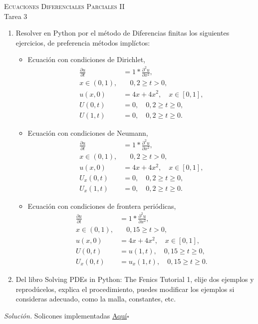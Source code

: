 \documentclass[12pt]{article}
\newcommand{\sol}{\textit{Solución. }}
\newcommand{\eej}{\hfill $\square$}
\begin{document}
    \pagestyle{empty}
    \begin{center}
        {\textsc{Ecuaciones Diferenciales Parciales II} \\
        \medskip 
        \large{Tarea 3}}
    \end{center}
    
    \bigskip
    
    \begin{enumerate}
        \item Resolver en Python por el método de Diferencias finitas los
        siguientes ejercicios, de preferencia métodos implíctos:
        \begin{itemize}
            \item Ecuación con condiciones de Dirichlet,
            \begin{align*}
                \frac{\partial u}{\partial t} &= 1
                *\frac{\partial^2u}{\partial x^2},\\
                x\in (0,1),&\quad 0,2\geq t > 0,\\
                u(x,0) &= 4x+4x^2,\quad x\in[0,1],\\
                U(0, t) &= 0,\quad 0,2 \geq t \geq 0,\\
                U(1, t) &= 0,\quad 0,2 \geq t \geq 0.
            \end{align*}

            \item Ecuación con condiciones de Neumann,
            \begin{align*}
                \frac{\partial u}{\partial t} &= 1
                *\frac{\partial^2u}{\partial x^2},\\
                x\in (0,1),&\quad 0,2\geq t > 0,\\
                u(x,0) &= 4x+4x^2,\quad x\in[0,1],\\
                U_x(0, t) &= 0,\quad 0,2 \geq t \geq 0,\\
                U_x(1, t) &= 0,\quad 0,2 \geq t \geq 0.
            \end{align*}

            \item Ecuación con condiciones de frontera periódicas,
            \begin{align*}
                \frac{\partial u}{\partial t} &= 1
                *\frac{\partial^2u}{\partial x^2},\\
                x\in (0,1),&\quad 0,15\geq t > 0,\\
                u(x,0) &= 4x+4x^2,\quad x\in[0,1],\\
                U(0, t) &= u(1,t),\quad 0,15 \geq t \geq 0,\\
                U_x(0, t) &= u_x(1,t),\quad 0,15 \geq t \geq 0.
            \end{align*}
        \end{itemize}
        
    \item Del libro Solving PDEs in Python: The Fenics Tutorial 1, elije dos
    ejemplos y reprodúcelos, explica el procedimiento, puedes modificar los
    ejemplos si consideras adecuado, como la malla, constantes, etc.
    \end{enumerate}

    \sol Solicones implementadas
    \href{https://github.com/HazelS002/EDP-II/tree/main}{Aquí}\eej
\end{document}
